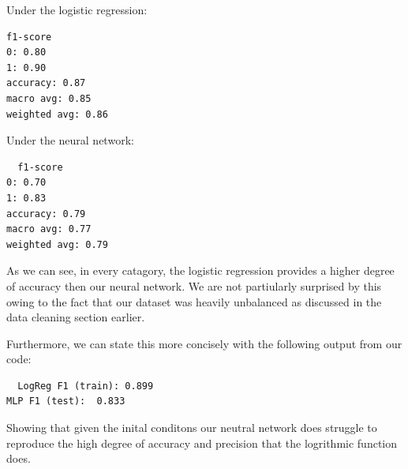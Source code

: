Under the logistic regression:
\begin{verbatim}
f1-score
0: 0.80
1: 0.90
accuracy: 0.87
macro avg: 0.85
weighted avg: 0.86
\end{verbatim}

Under the neural network:
\begin{verbatim}
  f1-score
0: 0.70
1: 0.83
accuracy: 0.79
macro avg: 0.77
weighted avg: 0.79
\end{verbatim}

As we can see, in every catagory, the logistic regression provides a higher degree of accuracy then our neural network.
We are not partiularly surprised by this owing to the fact that our dataset was heavily unbalanced as discussed in the data cleaning section earlier.

Furthermore, we can state this more concisely with the following output from our code:

\begin{verbatim}
  LogReg F1 (train): 0.899
MLP F1 (test):  0.833
\end{verbatim}

Showing that given the inital conditons our neutral network does struggle to reproduce the high degree of accuracy and precision that the logrithmic function does.


